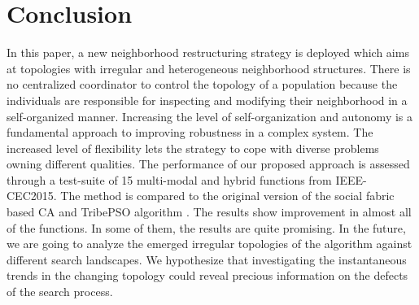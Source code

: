 \documentclass{llncs}
\begin{document}
\section{Conclusion}
In this paper, a new neighborhood restructuring strategy is deployed which aims at topologies with irregular and heterogeneous neighborhood structures. There is no centralized coordinator to control the topology of a population because the individuals are responsible for inspecting and modifying their neighborhood in a self-organized manner. Increasing the level of self-organization and autonomy is a fundamental approach to improving robustness in a complex system. The increased level of flexibility lets the strategy to cope with diverse problems owning different qualities. \newline
The performance of our proposed approach is assessed through a test-suite of 15 multi-modal and hybrid functions from IEEE-CEC2015. The method is compared to the original version of the social fabric based CA \cite{ali2016leveraged} and TribePSO algorithm \cite{chen2006tribe}. The results show improvement in almost all of the functions. In some of them, the results are quite promising. In the future, we are going to analyze the emerged irregular topologies of the algorithm against different search landscapes. We hypothesize that investigating the instantaneous trends in the changing topology could reveal precious information on the defects of the search process.
\end{document}
